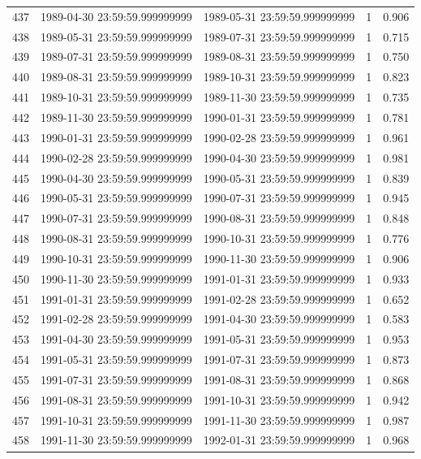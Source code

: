 \begin{table}
\begin{tabular}{lcccc}
437 & 1989-04-30 23:59:59.999999999 & 1989-05-31 23:59:59.999999999 & 1 & 0.906 \\
438 & 1989-05-31 23:59:59.999999999 & 1989-07-31 23:59:59.999999999 & 1 & 0.715 \\
439 & 1989-07-31 23:59:59.999999999 & 1989-08-31 23:59:59.999999999 & 1 & 0.750 \\
440 & 1989-08-31 23:59:59.999999999 & 1989-10-31 23:59:59.999999999 & 1 & 0.823 \\
441 & 1989-10-31 23:59:59.999999999 & 1989-11-30 23:59:59.999999999 & 1 & 0.735 \\
442 & 1989-11-30 23:59:59.999999999 & 1990-01-31 23:59:59.999999999 & 1 & 0.781 \\
443 & 1990-01-31 23:59:59.999999999 & 1990-02-28 23:59:59.999999999 & 1 & 0.961 \\
444 & 1990-02-28 23:59:59.999999999 & 1990-04-30 23:59:59.999999999 & 1 & 0.981 \\
445 & 1990-04-30 23:59:59.999999999 & 1990-05-31 23:59:59.999999999 & 1 & 0.839 \\
446 & 1990-05-31 23:59:59.999999999 & 1990-07-31 23:59:59.999999999 & 1 & 0.945 \\
447 & 1990-07-31 23:59:59.999999999 & 1990-08-31 23:59:59.999999999 & 1 & 0.848 \\
448 & 1990-08-31 23:59:59.999999999 & 1990-10-31 23:59:59.999999999 & 1 & 0.776 \\
449 & 1990-10-31 23:59:59.999999999 & 1990-11-30 23:59:59.999999999 & 1 & 0.906 \\
450 & 1990-11-30 23:59:59.999999999 & 1991-01-31 23:59:59.999999999 & 1 & 0.933 \\
451 & 1991-01-31 23:59:59.999999999 & 1991-02-28 23:59:59.999999999 & 1 & 0.652 \\
452 & 1991-02-28 23:59:59.999999999 & 1991-04-30 23:59:59.999999999 & 1 & 0.583 \\
453 & 1991-04-30 23:59:59.999999999 & 1991-05-31 23:59:59.999999999 & 1 & 0.953 \\
454 & 1991-05-31 23:59:59.999999999 & 1991-07-31 23:59:59.999999999 & 1 & 0.873 \\
455 & 1991-07-31 23:59:59.999999999 & 1991-08-31 23:59:59.999999999 & 1 & 0.868 \\
456 & 1991-08-31 23:59:59.999999999 & 1991-10-31 23:59:59.999999999 & 1 & 0.942 \\
457 & 1991-10-31 23:59:59.999999999 & 1991-11-30 23:59:59.999999999 & 1 & 0.987 \\
458 & 1991-11-30 23:59:59.999999999 & 1992-01-31 23:59:59.999999999 & 1 & 0.968 \\

\end{tabular}
\end{table}
